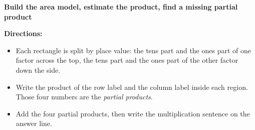 \documentclass[12pt]{article}
\begin{document}

\noindent\textbf{Build the area model, estimate the product, find a missing partial product}

\vspace{0.15cm}
\noindent\textbf{Directions:}
\begin{itemize}[leftmargin=0.9cm, itemsep=2pt, topsep=3pt]
  \item Each rectangle is split by place value: the tens part and the ones part
        of one factor across the top, the tens part and the ones part of the
        other factor down the side.
  \item Write the product of the row label and the column label inside each
        region. Those four numbers are the \emph{partial products}.
  \item Add the four partial products, then write the multiplication sentence
        on the answer line.
\end{itemize}



\end{document}
